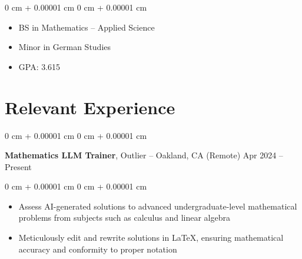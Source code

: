 \documentclass[10pt, letterpaper]{article}
\newenvironment{highlights}{
    \begin{itemize}[
        topsep=0.10 cm,
        parsep=0.10 cm,
        partopsep=0pt,
        itemsep=0pt,
        leftmargin=0 cm + 10pt
    ]
}{
    \end{itemize}
} %
\newenvironment{onecolentry}{
    \begin{adjustwidth}{
        0 cm + 0.00001 cm
    }{
        0 cm + 0.00001 cm
    }
}{
    \end{adjustwidth}
} %
\newenvironment{twocolentry}[2][]{
    \onecolentry
    \def\secondColumn{#2}
    \setcolumnwidth{\fill, 4.5 cm}
    \begin{paracol}{2}
}{
    \switchcolumn \raggedleft \secondColumn
    \end{paracol}
    \endonecolentry
} %
\begin{document}
        \vspace{0.10 cm}
        \begin{onecolentry}
            \begin{highlights}
                \item BS in Mathematics –  Applied Science
                \item Minor in German Studies
                \item GPA: 3.615
            \end{highlights}
        \end{onecolentry}



    
    \section{Relevant Experience}


        
      



        \begin{twocolentry}{
            Apr 2024 – Present
        }
            \textbf{Mathematics LLM Trainer}, Outlier –  Oakland, CA (Remote)\end{twocolentry}

        \vspace{0.10 cm}
        \begin{onecolentry}
            \begin{highlights}
                \item Assess AI-generated solutions to advanced undergraduate-level mathematical problems from subjects such as calculus and linear algebra
                \item Meticulously edit and rewrite solutions in LaTeX, ensuring mathematical accuracy and conformity to proper notation
            \end{highlights}
        \end{onecolentry}
        
\end{document}
